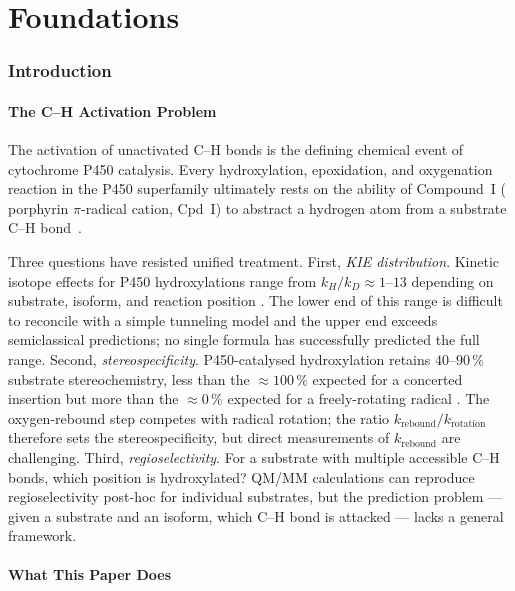 \documentclass[11pt,twocolumn,a4paper]{article}
\theoremstyle{definition}
\theoremstyle{remark}
\newcommand{\krebound}{k_{\mathrm{rebound}}}
\begin{document}
\part{Foundations}

\section{Introduction}
\label{sec:introduction}

\subsection{The C--H Activation Problem}

The activation of unactivated C--H bonds is the defining chemical event of
cytochrome P450 catalysis. Every hydroxylation, epoxidation, and oxygenation
reaction in the P450 superfamily ultimately rests on the ability of
Compound~I ( porphyrin $\pi$-radical cation, Cpd~I) to abstract
a hydrogen atom from a substrate C--H bond~\citep{groves1976, shaik2010}.

Three questions have resisted unified treatment. First, \emph{KIE
distribution}. Kinetic isotope effects for P450 hydroxylations range from
$k_H/k_D \approx 1$--$13$ depending on substrate, isoform, and reaction
position \citep{groves1985, guengerich2001}. The lower end of this range is
difficult to reconcile with a simple tunneling model and the upper end exceeds
semiclassical predictions; no single formula has successfully predicted the
full range. Second, \emph{stereospecificity}. P450-catalysed hydroxylation
retains $40$--$90\,\%$ substrate stereochemistry, less than the
$\approx 100\,\%$ expected for a concerted insertion but more than the
$\approx 0\,\%$ expected for a freely-rotating radical
\citep{groves1985, newcomb1995}. The oxygen-rebound step competes with
radical rotation; the ratio $\krebound / k_{\mathrm{rotation}}$ therefore
sets the stereospecificity, but direct measurements of $\krebound$ are
challenging. Third, \emph{regioselectivity}. For a substrate with multiple
accessible C--H bonds, which position is hydroxylated? QM/MM calculations
can reproduce regioselectivity post-hoc for individual substrates, but the
prediction problem --- given a substrate and an isoform, which C--H bond
is attacked --- lacks a general framework.

\subsection{What This Paper Does}
\end{document}
